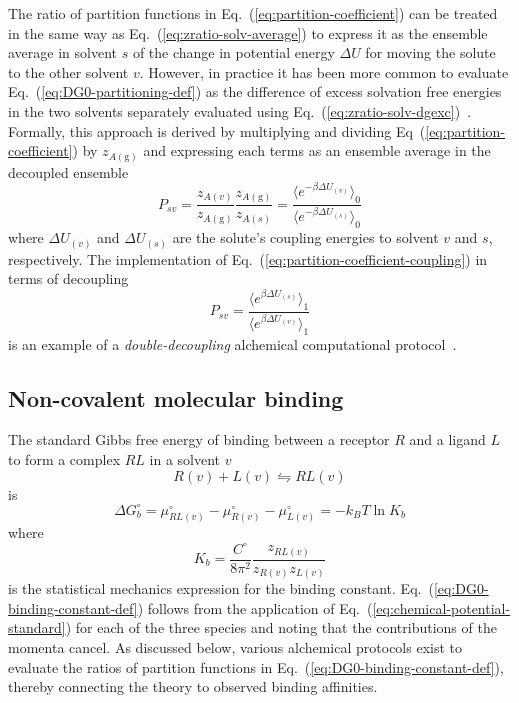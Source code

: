 \documentclass[9pt,bestpractices]{livecoms}
\begin{document}
The ratio of partition functions in Eq.~(\ref{eq:partition-coefficient}) can be treated in the same way as Eq.~(\ref{eq:zratio-solv-average}) to express it as the ensemble average in solvent $s$ of the change in potential energy $\Delta U$ for moving the solute to the other solvent $v$. However, in practice it has been more common to evaluate Eq.~(\ref{eq:DG0-partitioning-def}) as the difference of excess solvation free energies in the two solvents separately evaluated using Eq.~(\ref{eq:zratio-solv-dgexc})~\cite{bosisio2016blinded}. Formally, this approach is derived by multiplying and dividing Eq~(\ref{eq:partition-coefficient}) by $z_{A(\mathrm{g})}$ and expressing each terms as an ensemble average in the decoupled ensemble
\begin{equation}
  P_{sv} = \frac{z_{A(v)}}{z_{A(\mathrm{g})}}  \frac{z_{A(\mathrm{g})}}{z_{A(s)}} = \frac{\langle e^{-\beta \Delta U_{(v)}} \rangle_0}{\langle e^{-\beta \Delta U_{(s)} } \rangle_0 }
  \label{eq:partition-coefficient-coupling}
\end{equation}
where $\Delta U_{(v)}$ and $\Delta U_{(s)}$ are the solute's coupling energies to solvent $v$ and $s$, respectively. 
The implementation of Eq.~(\ref{eq:partition-coefficient-coupling}) in terms of decoupling
\begin{equation}
P_{sv} = \frac{\langle e^{\beta \Delta U_{(s)}} \rangle_1}{\langle e^{\beta \Delta U_{(v)} } \rangle_1 }
\label{eq:partition-coefficient-decoupling}
\end{equation}
is an example of a \emph{double-decoupling} alchemical computational protocol~\cite{hermans1986freeenergy,gilson1997statisticalthermodynamic}.

\subsection{Non-covalent molecular binding}
\label{sec:non-covalent-molecular-binding}

The standard Gibbs free energy of binding between a receptor $R$ and a ligand $L$ to form a complex $RL$ in a solvent $v$
\begin{equation}
  R(v) + L(v)  \leftrightharpoons RL(v)
  \label{eq:binding-reaction}
\end{equation}
is
\begin{equation}
  \Delta G^\circ_{b} = \mu^\circ_{RL(v)}  - \mu^\circ_{R(v)} - \mu^\circ_{L(v)} = -k_B T \ln K_b 
  \label{eq:DG0-binding-def}
\end{equation}
where~\cite{gilson1997statisticalthermodynamic,gilson2007calculation}
\begin{equation}
  K_b = \frac{C^\circ}{8 \pi^2} \frac{z_{RL(v)}}{z_{R(v)} z_{L(v)}}
  \label{eq:DG0-binding-constant-def}
\end{equation}
is the statistical mechanics expression for the binding constant. Eq.~(\ref{eq:DG0-binding-constant-def}) follows from the application of  Eq.~(\ref{eq:chemical-potential-standard}) for each of the three species and noting that the contributions of the momenta cancel. As discussed below, various alchemical protocols exist to evaluate the ratios of partition functions in Eq.~(\ref{eq:DG0-binding-constant-def}), thereby connecting the theory to observed binding affinities.
\end{document}
